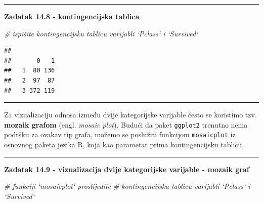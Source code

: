 \documentclass[]{book}
\newenvironment{Shaded}{\begin{snugshade}}{\end{snugshade}}
\newcommand{\KeywordTok}[1]{\textcolor[rgb]{0.13,0.29,0.53}{\textbf{#1}}}
\newcommand{\CommentTok}[1]{\textcolor[rgb]{0.56,0.35,0.01}{\textit{#1}}}
\newcommand{\OperatorTok}[1]{\textcolor[rgb]{0.81,0.36,0.00}{\textbf{#1}}}
\newcommand{\NormalTok}[1]{#1}
\theoremstyle{definition}
\theoremstyle{definition}
\theoremstyle{definition}
\theoremstyle{remark}
\begin{document}
\begin{center}\rule{0.5\linewidth}{\linethickness}\end{center}

\textbf{Zadatak 14.8 - kontingencijska tablica}

\begin{Shaded}
\begin{Highlighting}[]
\CommentTok{# ispišite kontingencijsku tablicu varijabli `Pclass` i `Survived`}
\end{Highlighting}
\end{Shaded}

\begin{Shaded}
\end{Shaded}

\begin{verbatim}
##    
##       0   1
##   1  80 136
##   2  97  87
##   3 372 119
\end{verbatim}

\begin{center}\rule{0.5\linewidth}{\linethickness}\end{center}

Za vizualizaciju odnosa između dvije kategorijske varijable često se
koristimo tzv. \textbf{mozaik grafom} (engl. \emph{mosaic plot}). Budući
da paket \texttt{ggplot2} trenutno nema podršku za ovakav tip grafa,
možemo se poslužiti funkcijom \texttt{mosaicplot} iz osnovnog paketa
jezika R, koja kao parametar prima kontingencijsku tablicu.

\begin{center}\rule{0.5\linewidth}{\linethickness}\end{center}

\textbf{Zadatak 14.9 - vizualizacija dvije kategorijske varijable -
mozaik graf}

\begin{Shaded}
\begin{Highlighting}[]
\CommentTok{# funkciji `mosaicplot` proslijedite }
\CommentTok{# kontingencijsku tablicu varijabli `Pclass` i `Survived`}
\end{Highlighting}
\end{Shaded}

\begin{Shaded}
\end{Shaded}
\end{document}
